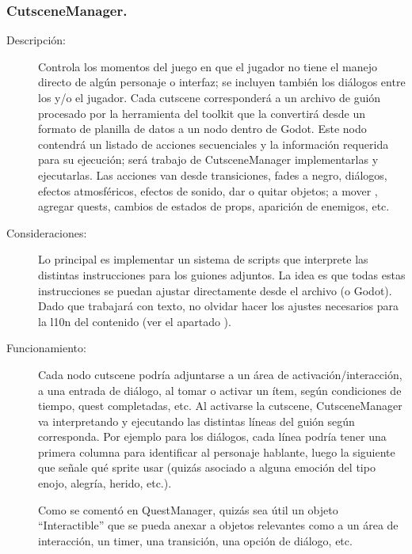 \subsubsection{CutsceneManager.}\label{modelado:cutscenemanager}
\begin{description}
	\item[Descripción:] Controla los momentos del juego en que el jugador no tiene el manejo directo de algún personaje o interfaz; se incluyen también los diálogos entre los  y/o el jugador. Cada cutscene corresponderá a un archivo de guión procesado por la herramienta del toolkit que la convertirá desde un formato de planilla de datos a un nodo dentro de Godot. Este nodo contendrá un listado de acciones secuenciales y la información requerida para su ejecución; será trabajo de CutsceneManager implementarlas y ejecutarlas. Las acciones van desde transiciones, fades a negro, diálogos, efectos atmosféricos, efectos de sonido, dar o quitar objetos; a mover , agregar quests, cambios de estados de props, aparición de enemigos, etc.
	
	\item[Consideraciones:] Lo principal es implementar un sistema de scripts que interprete las distintas instrucciones para los guiones adjuntos. La idea es que todas estas instrucciones se puedan ajustar directamente desde el archivo (o Godot). Dado que trabajará con texto, no olvidar hacer los ajustes necesarios para la l10n del contenido (ver el apartado ).
	
	\item[Funcionamiento:] Cada nodo cutscene podría adjuntarse a un área de activación/interacción, a una entrada de diálogo, al tomar o activar un ítem, según condiciones de tiempo, quest completadas, etc. Al activarse la cutscene, CutsceneManager va interpretando y ejecutando las distintas líneas del guión según corresponda. Por ejemplo para los diálogos, cada línea podría tener una primera columna para identificar al personaje hablante, luego la siguiente que señale qué sprite usar (quizás asociado a alguna emoción del tipo enojo, alegría, herido, etc.).
	
	Como se comentó en QuestManager, quizás sea útil un objeto “Interactible” que se pueda anexar a objetos relevantes como a un área de interacción, un timer, una transición, una opción de diálogo, etc.
\end{description}
	
